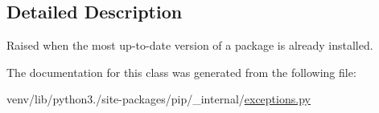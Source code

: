 \subsection{Detailed Description}
\begin{DoxyVerb}Raised when the most up-to-date version of a package is already
installed.\end{DoxyVerb}
 

The documentation for this class was generated from the following file\+:\begin{DoxyCompactItemize}
\item 
venv/lib/python3./site-\/packages/pip/\+\_\+internal/\hyperlink{pip_2__internal_2exceptions_8py}{exceptions.\+py}\end{DoxyCompactItemize}
